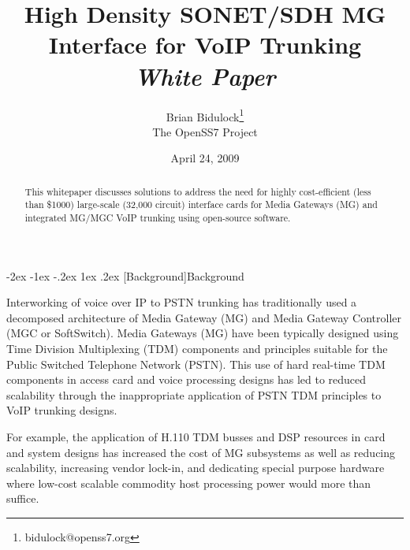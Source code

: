 \documentclass[letterpaper,final,notitlepage,twocolumn,10pt,twoside]{article}
\makeatletter
\let\large = \normalsize
\let\normalsize = \small
\let\small = \footnotesize
\let\footnotesize = \scriptsize
\let\scriptsize = \tiny
\renewcommand\section{\@startsection {section}{1}{\z@}%
                                   {-2ex \@plus -1ex \@minus -.2ex}%
                                   {1ex \@plus .2ex}%
                                   {\normalfont\large\bfseries}}
\makeatother
\begin{document}

\title{High Density SONET/SDH MG Interface for VoIP Trunking\\[0.5ex]
	{\large \textsl{White Paper}}}
\author{Brian Bidulock\thanks{bidulock@openss7.org}\\
	The OpenSS7 Project}
\date{April 24, 2009}
\maketitle

\begin{abstract}
This whitepaper discusses solutions to address the need for highly
cost-efficient (less than \$1000) large-scale (32,000 circuit) interface cards
for Media Gateways (MG) and integrated MG/MGC VoIP trunking using open-source
software.
\end{abstract}


\section[Background]{Background}


Interworking of voice over IP to PSTN trunking has traditionally used a
decomposed architecture of Media Gateway (MG) and Media Gateway Controller (MGC
or SoftSwitch).  Media Gateways (MG) have been typically designed using Time
Division Multiplexing (TDM) components and principles suitable for the Public
Switched Telephone Network (PSTN).  This use of hard real-time TDM components in
access card and voice processing designs has led to reduced scalability through
the inappropriate application of PSTN TDM principles to VoIP trunking designs.

For example, the application of H.110 TDM busses and DSP resources in card and
system designs has increased the cost of MG subsystems as well as reducing
scalability, increasing vendor lock-in, and dedicating special purpose hardware
where low-cost scalable commodity host processing power would more than suffice.
\end{document}
